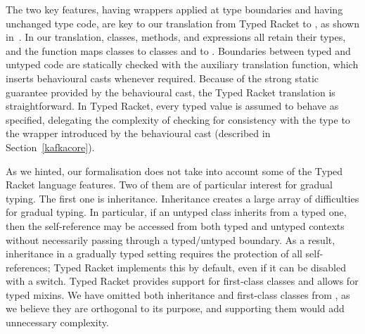 \documentclass[acmlarge, anonymous, authordraft, review]{acmart} %
\begin{document}
The two key features, having wrappers applied at type boundaries and having
unchanged type code, are key to our translation from Typed Racket to \kafka,
as shown in~. In our translation, classes, 
methods, and expressions all retain their types, and the  function maps classes to classes and \any to \any. Boundaries between typed and untyped
code are statically checked with the auxiliary translation function, which inserts behavioural casts whenever  required. Because of the strong static guarantee provided by the behavioural cast, the
Typed Racket translation is  straightforward. In Typed Racket, every typed
value is assumed to behave as specified, delegating the complexity of checking
for consistency with the type to the wrapper introduced by the behavioural cast (described in Section~\ref{kafkacore}).

As we hinted, our formalisation does not take into account some of the Typed Racket language features.  Two of them are of particular interest for gradual typing.  The first one is inheritance.
Inheritance creates a large array of difficulties for gradual typing.
In particular, if an untyped class inherits from a typed one, then the self-reference may be accessed from both typed and untyped contexts without
necessarily passing through a typed/untyped boundary. As a result, inheritance
in a gradually typed setting requires the protection of all self-references; Typed Racket implements this by default, even if it can be disabled with a switch.  Typed Racket provides support for first-class classes and allows for
typed mixins.  We have omitted both inheritance and first-class classes from  \kafka, as we believe they are orthogonal to its purpose, and supporting them would add unnecessary complexity.

\end{document}
